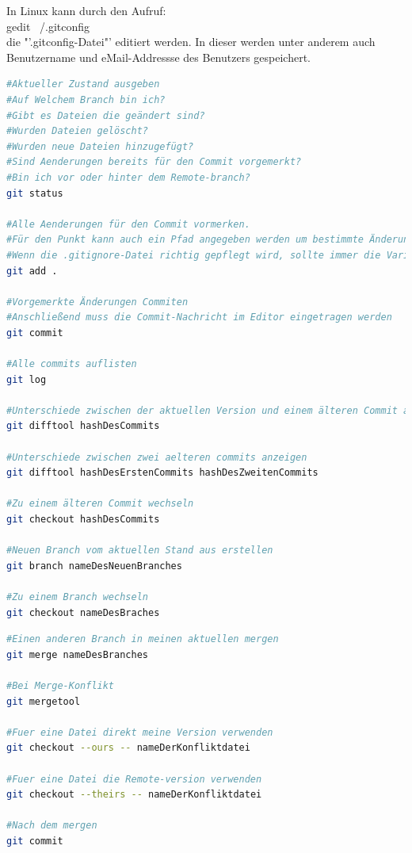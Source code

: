 
In Linux kann durch den Aufruf:\\
gedit ~/.gitconfig\\
die "'.gitconfig-Datei"' editiert werden. In dieser werden unter anderem auch Benutzername und eMail-Addressse des Benutzers gespeichert.
\nsecend

\begin{lstlisting}[language=bash]
#Aktueller Zustand ausgeben
#Auf Welchem Branch bin ich?
#Gibt es Dateien die geändert sind? 
#Wurden Dateien gelöscht? 
#Wurden neue Dateien hinzugefügt?
#Sind Aenderungen bereits für den Commit vorgemerkt?
#Bin ich vor oder hinter dem Remote-branch?
git status

#Alle Aenderungen für den Commit vormerken.
#Für den Punkt kann auch ein Pfad angegeben werden um bestimmte Änderungen vorzumerken.
#Wenn die .gitignore-Datei richtig gepflegt wird, sollte immer die Variante mit dem Punkt verwendet werden können.
git add .

#Vorgemerkte Änderungen Commiten
#Anschließend muss die Commit-Nachricht im Editor eingetragen werden
git commit

#Alle commits auflisten
git log

#Unterschiede zwischen der aktuellen Version und einem älteren Commit anzeigen
git difftool hashDesCommits

#Unterschiede zwischen zwei aelteren commits anzeigen
git difftool hashDesErstenCommits hashDesZweitenCommits

#Zu einem älteren Commit wechseln
git checkout hashDesCommits

#Neuen Branch vom aktuellen Stand aus erstellen
git branch nameDesNeuenBranches

#Zu einem Branch wechseln
git checkout nameDesBraches

\end{lstlisting}
\nsecend

\begin{lstlisting}[language=bash]
#Einen anderen Branch in meinen aktuellen mergen
git merge nameDesBranches

#Bei Merge-Konflikt
git mergetool

#Fuer eine Datei direkt meine Version verwenden 
git checkout --ours -- nameDerKonfliktdatei

#Fuer eine Datei die Remote-version verwenden
git checkout --theirs -- nameDerKonfliktdatei

#Nach dem mergen
git commit
\end{lstlisting}
\nsecend

